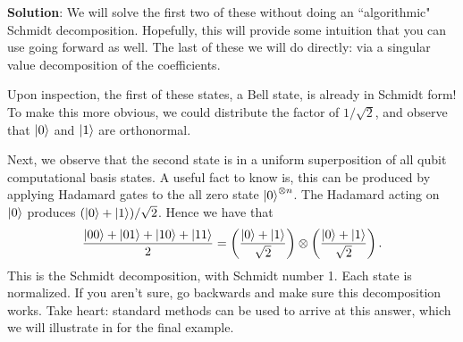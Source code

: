 \documentclass{book}
\begin{document}
    \textbf{Solution}: We will solve the first two of these without doing an ``algorithmic" Schmidt decomposition. Hopefully, this will provide some intuition that you can use going forward as well. The last of these we will do directly: via a singular value decomposition of the coefficients. 
    
    Upon inspection, the first of these states, a Bell state, is already in Schmidt form! To make this more obvious, we could distribute the factor of $1/\sqrt{2}$, and observe that $\ket{0}$ and $\ket{1}$ are orthonormal. 

    Next, we observe that the second state is in a uniform superposition of all qubit computational basis states. A useful fact to know is, this can be produced by applying Hadamard gates to the all zero state $\ket{0}^{\otimes n}$. The Hadamard acting on $\ket{0}$ produces $(\ket{0} + \ket{1})/\sqrt{2}$. Hence we have that 
    \begin{align}
        \frac{\ket{00} + \ket{01} + \ket{10} + \ket{11}}{2} = \left(\frac{\ket{0}+\ket{1}}{\sqrt{2}}\right)\otimes \left(\frac{\ket{0}+\ket{1}}{\sqrt{2}}\right).
    \end{align}
    This is the Schmidt decomposition, with Schmidt number 1. Each state is normalized. If you aren't sure, go backwards and make sure this decomposition works. Take heart: standard methods can be used to arrive at this answer, which we will illustrate in for the final example. 
\end{document}
